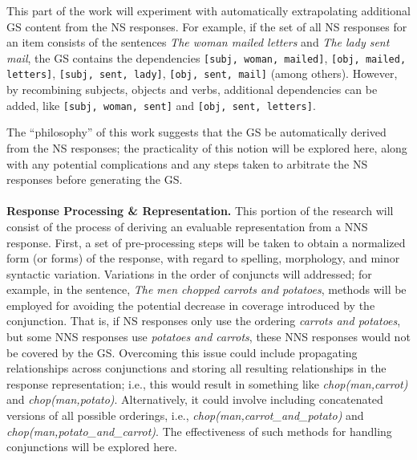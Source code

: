 This part of the work will experiment with automatically extrapolating additional GS content from the NS responses. For example, if the set of all NS responses for an item consists of the sentences \textit{The woman mailed letters} and \textit{The lady sent mail}, the GS contains the dependencies \texttt{[subj, woman, mailed]}, \texttt{[obj, mailed, letters]}, \texttt{[subj, sent, lady]}, \texttt{[obj, sent, mail]} (among others). However, by recombining subjects, objects and verbs, additional dependencies can be added, like \texttt{[subj, woman, sent]} and \texttt{[obj, sent, letters]}.
\par
The ``philosophy'' of this work suggests that the GS be automatically derived from the NS responses; the practicality of this notion will be explored here, along with any potential complications and any steps taken to arbitrate the NS responses before generating the GS.\\
\\
\textbf{Response Processing \& Representation.} This portion of the research will consist of the process of deriving an evaluable representation from a NNS response. First, a set of pre-processing steps will be taken to obtain a normalized form (or forms) of the response, with regard to spelling, morphology, and minor syntactic variation. Variations in the order of conjuncts will addressed; for example, in the sentence, \textit{The men chopped carrots and potatoes}, methods will be employed for avoiding the potential decrease in coverage introduced by the conjunction. That is, if NS responses only use the ordering \textit{carrots and potatoes}, but some NNS responses use \textit{potatoes and carrots}, these NNS responses would not be covered by the GS. Overcoming this issue could include propagating relationships across conjunctions and storing all resulting relationships in the response representation; i.e., this would result in something like \textit{chop(man,carrot)} and \textit{chop(man,potato)}. Alternatively, it could involve including concatenated versions of all possible orderings, i.e., \textit{chop(man,carrot\_and\_potato)} and \textit{chop(man,potato\_and\_carrot)}. The effectiveness of such methods for handling conjunctions will be explored here.
